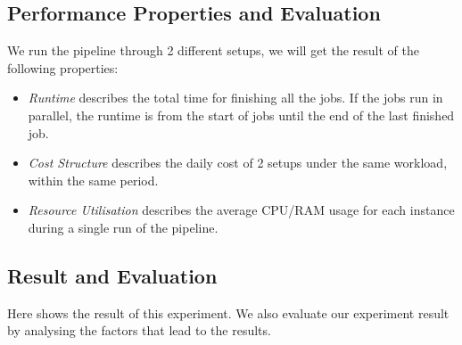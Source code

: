 \subsection{Performance Properties and Evaluation}
We run the pipeline through 2 different setups, we will get the result of the following properties:
\begin{itemize}
\item \textit{Runtime} describes the total time for finishing all the jobs. If the jobs run in parallel, the runtime is from the start of jobs until the end of the last finished job.
\item \textit{Cost Structure} describes the daily cost of 2 setups under the same workload, within the same period.
\item \textit{Resource Utilisation} describes the average CPU/RAM usage for each instance during a single run of the pipeline.
\end{itemize}
\subsection{Result and Evaluation}
Here shows the result of this experiment. We also evaluate our experiment result by analysing the factors that lead to the results.
